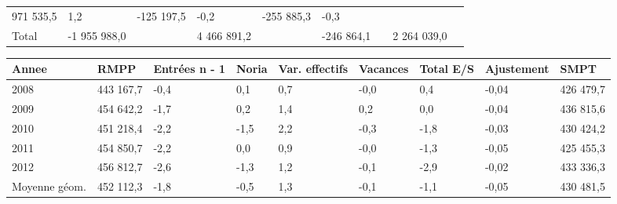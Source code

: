\begin{longtable}[]{@{}lllllllll@{}}
\begin{minipage}[t]{0.16\columnwidth}
971 535,5\strut
\end{minipage} & \begin{minipage}[t]{0.06\columnwidth}\raggedright
1,2\strut
\end{minipage} & \begin{minipage}[t]{0.12\columnwidth}\raggedright
-125 197,5\strut
\end{minipage} & \begin{minipage}[t]{0.06\columnwidth}\raggedright
-0,2\strut
\end{minipage} & \begin{minipage}[t]{0.10\columnwidth}\raggedright
-255 885,3\strut
\end{minipage} & \begin{minipage}[t]{0.06\columnwidth}\raggedright
-0,3\strut
\end{minipage}\tabularnewline
\begin{minipage}[t]{0.05\columnwidth}\raggedright
Total\strut
\end{minipage} & \begin{minipage}[t]{0.10\columnwidth}\raggedright
-1 955 988,0\strut
\end{minipage} & \begin{minipage}[t]{0.06\columnwidth}\raggedright
\strut
\end{minipage} & \begin{minipage}[t]{0.16\columnwidth}\raggedright
4 466 891,2\strut
\end{minipage} & \begin{minipage}[t]{0.06\columnwidth}\raggedright
\strut
\end{minipage} & \begin{minipage}[t]{0.12\columnwidth}\raggedright
-246 864,1\strut
\end{minipage} & \begin{minipage}[t]{0.06\columnwidth}\raggedright
\strut
\end{minipage} & \begin{minipage}[t]{0.10\columnwidth}\raggedright
2 264 039,0\strut
\end{minipage} & \begin{minipage}[t]{0.06\columnwidth}\raggedright
\strut
\end{minipage}\tabularnewline
\bottomrule
\end{longtable}

\begin{longtable}[]{@{}lllllllll@{}}
\toprule
Annee & RMPP & Entrées n - 1 & Noria & Var. effectifs & Vacances & Total
E/S & Ajustement & SMPT\tabularnewline
\midrule
\endhead
2008 & 443 167,7 & -0,4 & 0,1 & 0,7 & -0,0 & 0,4 & -0,04 & 426
479,7\tabularnewline
2009 & 454 642,2 & -1,7 & 0,2 & 1,4 & 0,2 & 0,0 & -0,04 & 436
815,6\tabularnewline
2010 & 451 218,4 & -2,2 & -1,5 & 2,2 & -0,3 & -1,8 & -0,03 & 430
424,2\tabularnewline
2011 & 454 850,7 & -2,2 & 0,0 & 0,9 & -0,0 & -1,3 & -0,05 & 425
455,3\tabularnewline
2012 & 456 812,7 & -2,6 & -1,3 & 1,2 & -0,1 & -2,9 & -0,02 & 433
336,3\tabularnewline
Moyenne géom. & 452 112,3 & -1,8 & -0,5 & 1,3 & -0,1 & -1,1 & -0,05 &
430 481,5\tabularnewline
\bottomrule
\end{longtable}

